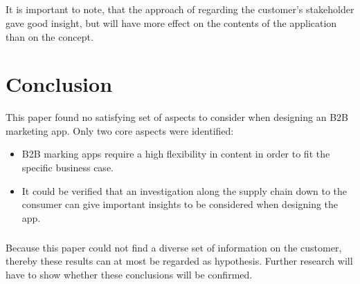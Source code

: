 \paragraph{} It is important to note, that the approach of regarding the customer's stakeholder gave good insight, but will have more effect on the contents of the application than on the concept. 

\chapter{Conclusion}
This paper found no satisfying set of aspects to consider when designing an B2B marketing app. Only two core aspects were identified:

\begin{itemize}
\item B2B marking apps require a high flexibility in content in order to fit the specific business case.
\item It could be verified that an investigation along the supply chain down to the consumer can give important insights to be considered when designing the app.
\end{itemize}

\paragraph{} Because this paper could not find a diverse set of information on the customer, thereby these results can at most be regarded as hypothesis. Further research will have to show whether these conclusions will be confirmed.
